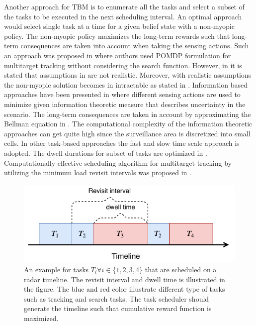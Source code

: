 \documentclass[11pt,a4paper]{article}
\begin{document}
Another approach for TBM is to enumerate all the tasks and select a subset of the tasks to be executed in the next scheduling interval.
An optimal approach would select single task at a time for a given belief state with a non-myopic policy.
The non-myopic policy maximizes the long-term rewards such that long-term consequences are taken into account when taking the sensing actions.
Such an approach was proposed in \cite{Krishnamurthy1999, Krishnamurthy2001, Scala2006} where authors used POMDP formulation for multitarget tracking without considering the search function.
However, in \cite{Wintenby2006} it is stated that assumptions in \cite{Krishnamurthy1999, Krishnamurthy2001} are not realistic.
Moreover, with realistic assumptions the non-myopic solution becomes in intractable as stated in \cite{Guha2007}.
Information based approaches have been presented in \cite{Kastella1997, Kreucher2004, Kreucher2005, Xu2010} where different sensing actions are used to minimize given information theoretic measure that describes uncertainty in the scenario.
The long-term consequences are taken in account by approximating the Bellman equation in \cite{Kreucher2005, Xu2010}.
The computational complexity of the information theoretic approaches can get quite high since the surveillance area is discretized into small cells.
In other task-based approaches the fast and slow time scale approach is adopted.
The dwell durations for subset of tasks are optimized in \cite{Byrne2015, Byrne2016}.
Computationally effective scheduling algorithm for multitarget tracking by utilizing the minimum load revisit intervals was proposed in \cite{Esfahani2012}.

\begin{figure}
    \centering
    \includegraphics{big_picture.pdf}
    \caption{
        An example for tasks $T_i \forall i\in\{1,2,3,4\}$ that are scheduled on a radar timeline. 
        The revisit interval and dwell time is illustrated in the figure.
        The blue and red color illustrate different type of tasks such as tracking and search tasks.
        The task scheduler should generate the timeline such that cumulative reward function is maximized. 
    }
    \label{fig:big_picture}
\end{figure}
\end{document}
